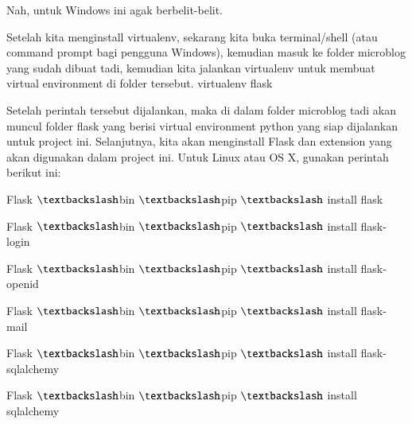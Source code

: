 \documentclass[a4paper,12pt]{report}
\begin{document}
\noindent 
{\fontsize{14pt}{14pt}\selectfont Nah, untuk Windows ini agak berbelit-belit. \\} \par
\noindent 
{\fontsize{14pt}{14pt}\selectfont Setelah kita menginstall virtualenv, sekarang kita buka terminal/shell (atau command prompt bagi pengguna Windows), kemudian masuk ke folder microblog yang sudah dibuat tadi, kemudian kita jalankan virtualenv untuk membuat virtual environment di folder tersebut.\vspace{\baselineskip}
virtualenv flask \\} \par
\noindent 
{\fontsize{14pt}{14pt}\selectfont Setelah perintah tersebut dijalankan, maka di dalam folder microblog tadi akan muncul folder flask yang berisi virtual environment python yang siap dijalankan untuk project ini. Selanjutnya, kita akan menginstall Flask dan extension yang akan digunakan dalam project ini. Untuk Linux atau OS X, gunakan perintah berikut ini: \\} \par
\vspace{14pt}
\noindent 
{\fontsize{14pt}{14pt}\selectfont Flask $  \textbackslash  $bin $  \textbackslash  $pip $  \textbackslash  $ install flask \\} \par
\vspace{14pt}
\noindent 
{\fontsize{14pt}{14pt}\selectfont Flask $  \textbackslash  $bin $  \textbackslash  $pip $  \textbackslash  $ install flask-login \\} \par
\vspace{14pt}
\noindent 
{\fontsize{14pt}{14pt}\selectfont Flask $  \textbackslash  $bin $  \textbackslash  $pip $  \textbackslash  $ install flask-openid \\} \par
\vspace{14pt}
\noindent 
{\fontsize{14pt}{14pt}\selectfont Flask $  \textbackslash  $bin $  \textbackslash  $pip $  \textbackslash  $ install flask-mail \\} \par
\vspace{14pt}
\noindent 
{\fontsize{14pt}{14pt}\selectfont Flask $  \textbackslash  $bin $  \textbackslash  $pip $  \textbackslash  $ install flask-sqlalchemy \\} \par
\vspace{14pt}
\noindent 
{\fontsize{14pt}{14pt}\selectfont Flask $  \textbackslash  $bin $  \textbackslash  $pip $  \textbackslash  $ install sqlalchemy \\} \par
\end{document}
